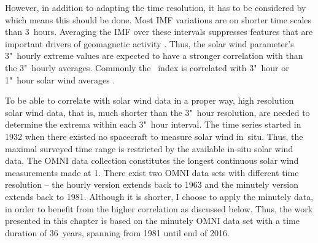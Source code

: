 However, in addition to adapting the time resolution, it has to be considered by which means this should be done. Most IMF variations are on shorter time scales than 3~hours. Averaging the IMF over these intervals suppresses features that are important drivers of geomagnetic activity \citep{Savani2017}. Thus, the solar wind parameter's 3"~hourly extreme values are expected to have a stronger correlation with \Kp{} than the 3"~hourly averages.
Commonly the \Kp~index is correlated with 3"~hour or 1"~hour solar wind averages \citep[e.g., ][]{Newell2007,Elliott2013,Savani2017}.

To be able to correlate \Kp{} with solar wind data in a proper way, high resolution solar wind data, that is, much shorter than the 3"~hour resolution, are needed to determine the extrema within each 3"~hour interval.
The \Kp{} time series started in 1932 when there existed no spacecraft to measure solar wind in~situ. Thus, the maximal surveyed time range is restricted by the available in-situ solar wind data.
The OMNI data collection constitutes the longest continuous solar wind measurements made at \SI{1}{\au}. There exist two OMNI data sets with different time resolution -- the hourly version extends back to 1963 and the minutely version extends back to 1981. Although it is shorter, I choose to apply the minutely data, in order to benefit from the higher correlation as discussed below. Thus, the work presented in this chapter is based on the minutely OMNI data set with a time duration of 36~years, spanning from 1981 until end of 2016.

